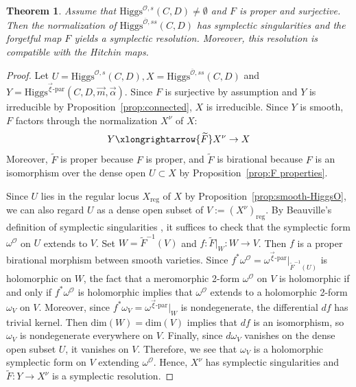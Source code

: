 \documentclass[11pt]{amsart}
\theoremstyle{plain}
\newtheorem{theorem}{Theorem}[section]
\theoremstyle{definition}
\theoremstyle{remark}
\newcommand{\cO}{\mathcal O}
\newcommand{\Higgs}{\mathrm{Higgs}}
\def\a{\alpha}
\def\dim{\mathrm{dim}}
\def\vxi{\vec{\xi}}
\def\vm{\vec{m}}
\def\va{\vec{\a}}
\begin{document}
\begin{theorem}\label{thm:symplectic resolution}
        Assume that $\Higgs^{\cO, s}(C,D)\neq \emptyset$ and $F$ is proper and surjective. 
        Then the normalization of $\Higgs^{\overline{\cO}, ss}(C,D)$ has symplectic singularities and the forgetful map $F$ yields a symplectic resolution. Moreover, this resolution is compatible with the Hitchin maps. 
\end{theorem}
\begin{proof}
    Let $U=\Higgs^{\cO, s}(C,D),X = \Higgs^{\overline{\cO}, ss}(C,D)$ and $Y= \Higgs^{\vxi\textrm{-par}}(C,D,\vm, \va)$. Since $F$ is surjective by assumption and $Y$ is irreducible by Proposition~\ref{prop:connected}, $X$ is irreducible. Since $Y$ is smooth, $F$ factors through the normalization $X^\nu$ of $X$: 
    \[ Y\xlongrightarrow{\widetilde{F}}X^{\nu}\to X\]
     Moreover, $\widetilde{F}$ is proper because $F$ is proper, and $\widetilde{F}$ is birational because $F$ is an isomorphism over the dense open $U\subset X$ by Proposition~\ref{prop:F properties}.

    Since $U$ lies in the regular locus $X_{\text{reg}}$ of $X$ by Proposition~\ref{prop:smooth-HiggsO}, we can also regard $U$ as a dense open subset of $V:=(X^{\nu})_{\text{reg}}$. By Beauville's definition of symplectic singularities \cite[Definition 1.1 and Remark 1.2]{Beauville2000}, it suffices to check that the symplectic form $\omega^\cO$ on $U$ extends to $V$. Set $W = \widetilde{F}^{-1}(V)$ and $f:\widetilde{F}|_W:W\to V$. Then $f$ is a proper birational morphism between smooth varieties. Since $f^*\omega^{\cO} = \omega^{\vxi\textrm{-par}}|_{\widetilde{F}^{-1}(U)}$ is holomorphic on $W$, the fact that a meromorphic 2-form $\omega^\cO$ on $V$ is holomorphic if and only if $f^*\omega^{\cO}$ is holomorphic implies that $\omega^\cO$ extends to a holomorphic 2-form $\omega_V$ on $V$. Moreover, since $f^*\omega_V = \omega^{\vxi\textrm{-par}}|_W$ is nondegenerate, the differential $df$ has trivial kernel. Then $\dim(W)= \dim(V)$ implies that $df$ is an isomorphism, so $\omega_V$ is nondegenerate everywhere on $V$. Finally, since $d\omega_V$ vanishes on the dense open subset $U$, it vanishes on $V$. Therefore, we see that $\omega_V$ is a holomorphic symplectic form on $V$ extending $\omega^\cO$. Hence, $X^\nu$ has symplectic singularities and $\widetilde{F}:Y\to X^\nu$ is a symplectic resolution. 

\end{proof}
\end{document}
